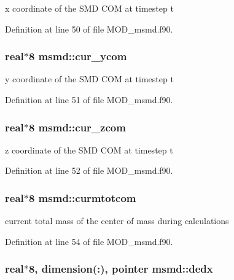 x coordinate of the S\-M\-D C\-O\-M at timestep t 



Definition at line 50 of file M\-O\-D\-\_\-msmd.\-f90.

\hypertarget{classmsmd_aef410996fee34e772a7840d5cdb7ab1c}{
\subsubsection[{cur\-\_\-ycom}]{\setlength{\rightskip}{0pt plus 5cm}real$\ast$8 msmd\-::cur\-\_\-ycom}}\label{classmsmd_aef410996fee34e772a7840d5cdb7ab1c}


y coordinate of the S\-M\-D C\-O\-M at timestep t 



Definition at line 51 of file M\-O\-D\-\_\-msmd.\-f90.

\hypertarget{classmsmd_ae554a126168530ae9e10a604cccf37ea}{
\subsubsection[{cur\-\_\-zcom}]{\setlength{\rightskip}{0pt plus 5cm}real$\ast$8 msmd\-::cur\-\_\-zcom}}\label{classmsmd_ae554a126168530ae9e10a604cccf37ea}


z coordinate of the S\-M\-D C\-O\-M at timestep t 



Definition at line 52 of file M\-O\-D\-\_\-msmd.\-f90.

\hypertarget{classmsmd_a6d28f460b2fadec4e174e9c79639f7cd}{
\subsubsection[{curmtotcom}]{\setlength{\rightskip}{0pt plus 5cm}real$\ast$8 msmd\-::curmtotcom}}\label{classmsmd_a6d28f460b2fadec4e174e9c79639f7cd}


current total mass of the center of mass during calculations 



Definition at line 54 of file M\-O\-D\-\_\-msmd.\-f90.

\hypertarget{classmsmd_a9343c86fbd3756f350b7f0f9b9b224a4}{
\subsubsection[{dedx}]{\setlength{\rightskip}{0pt plus 5cm}real$\ast$8, dimension(\-:), pointer msmd\-::dedx}}\label{classmsmd_a9343c86fbd3756f350b7f0f9b9b224a4}


